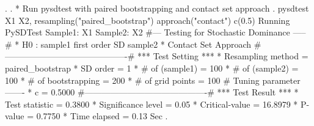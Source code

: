 . 
. * Run pysdtest with paired bootstrapping and contact set approach
. pysdtest X1 X2, resampling("paired_bootstrap") approach("contact") c(0.5)
Running PySDTest
Sample1: X1
Sample2: X2
{\smallskip}
\#--- Testing for Stochastic Dominance  -----\#
{\smallskip}
* H0 : sample1 first order SD sample2
* Contact Set Approach
{\smallskip}
\#-------------------------------------------\#
{\smallskip}
*** Test Setting ***
* Resampling method      = paired_bootstrap
* SD order               =      1
* \# of (sample1)         =    100 
* \# of (sample2)         =    100
* \# of bootstrapping     =    200
* \# of grid points       =    100
{\smallskip}
\# Tuning parameter -------
* c                      = 0.5000
{\smallskip}
\#-------------------------------------------\#
{\smallskip}
*** Test Result ***
* Test statistic         = 0.3800
* Significance level     =  0.05
* Critical-value         = 16.8979
* P-value                = 0.7750
* Time elapsed           =  0.13 Sec
{\smallskip}
. 
